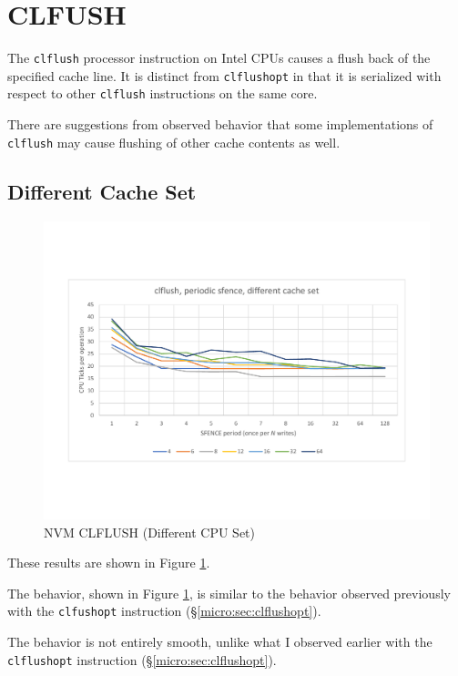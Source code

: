 \section{CLFUSH}\label{micro:sec:clflush}

The \texttt{clflush} processor instruction on Intel CPUs
causes a flush back of the specified cache line.  It is
distinct from \texttt{clflushopt} in that it is serialized
with respect to other \texttt{clflush} instructions on the same core.

There are suggestions from observed behavior that some
implementations of \texttt{clflush} may cause flushing of
other cache contents as well.

\subsection{Different Cache Set}
\begin{figure}
    \centering
    \caption{NVM CLFLUSH (Different CPU Set)}\label{micro:clflush:different}
    \includegraphics[scale=0.35]{micro/nvm-clflush-periodic-different.pdf}
\end{figure}

These results are shown in Figure \ref{micro:clflush:different}.

The behavior, shown in Figure \ref{micro:clflush:different},
is similar to the behavior observed previously with the
\texttt{clfushopt} instruction (\S \ref{micro:sec:clflushopt}).

The behavior is not entirely smooth, unlike what I observed
earlier with the \texttt{clflushopt} instruction (\S \ref{micro:sec:clflushopt}).

